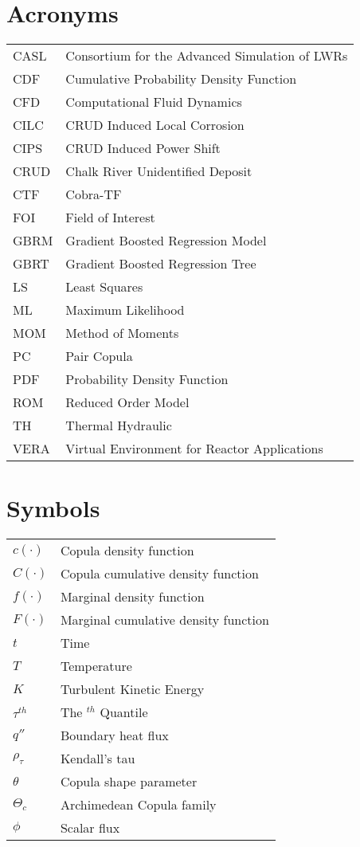 
\section*{Acronyms}
\begin{tabular}{l l}
CASL & Consortium for the Advanced Simulation of LWRs \\
CDF  & Cumulative Probability Density Function \\
CFD &  Computational Fluid Dynamics \\
CILC & CRUD Induced Local Corrosion \\
CIPS & CRUD Induced Power Shift \\
CRUD & Chalk River Unidentified Deposit \\
CTF &  Cobra-TF \\
FOI &  Field of Interest \\
GBRM & Gradient Boosted Regression Model \\
GBRT & Gradient Boosted Regression Tree \\
LS  &  Least Squares \\
ML  &  Maximum Likelihood \\
MOM &  Method of Moments \\
PC  &  Pair Copula \\
PDF  &  Probability Density Function \\
ROM &  Reduced Order Model \\
TH  &  Thermal Hydraulic \\
VERA & Virtual Environment for Reactor Applications \\
\end{tabular}

\section*{Symbols}
\begin{tabular}{l l}
$c(\cdot)$ & Copula density function \\
$C(\cdot)$ & Copula cumulative density function \\
$f(\cdot)$ & Marginal density function \\
$F(\cdot)$ & Marginal cumulative density function \\
$t$ & Time \\
$T$ & Temperature \\
$K$ & Turbulent Kinetic Energy \\
$\tau^{th}$ & The $^{th}$ Quantile \\
$q''$ & Boundary heat flux \\
$\rho_{\tau}$ & Kendall's tau \\
$\theta$ & Copula shape parameter \\
$\Theta_c$ & Archimedean Copula family \\
$\phi$ & Scalar flux \\
\end{tabular}

\pagebreak
